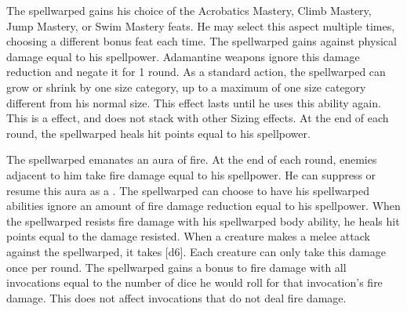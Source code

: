         The spellwarped gains his choice of the Acrobatics Mastery, Climb Mastery, Jump Mastery, or Swim Mastery feats.
        He may select this aspect multiple times, choosing a different bonus feat each time.
        The spellwarped gains  against physical damage equal to his spellpower.
        Adamantine weapons ignore this damage reduction and negate it for 1 round.
        As a standard action, the spellwarped can grow or shrink by one size category, up to a maximum of one size category different from his normal size.
        This effect lasts until he uses this ability again.
        This is a  effect, and does not stack with other Sizing effects.
        At the end of each round, the spellwarped heals hit points equal to his spellpower.

        The spellwarped emanates an aura of fire.
        At the end of each round, enemies adjacent to him take fire damage equal to his spellpower.
        He can suppress or resume this aura as a .
        The spellwarped can choose to have his spellwarped abilities ignore an amount of fire damage reduction equal to his spellpower.
        When the spellwarped resists fire damage with his spellwarped body ability, he heals hit points equal to the damage resisted.
        When a creature makes a melee attack against the spellwarped, it takes [d6].
        Each creature can only take this damage once per round.
        The spellwarped gains a bonus to fire damage with all invocations equal to the number of dice he would roll for that invocation's fire damage.
        This does not affect invocations that do not deal fire damage.

